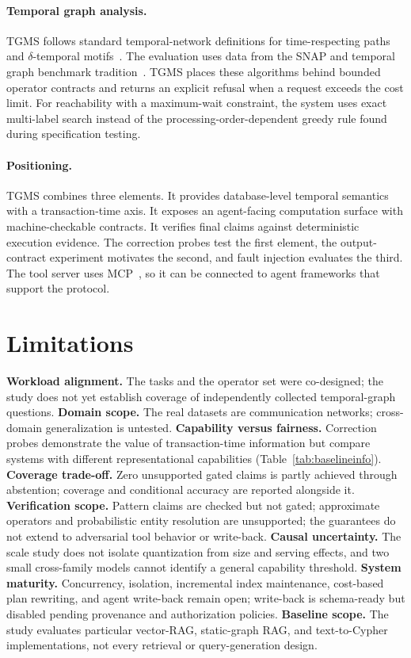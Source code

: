 \documentclass[11pt]{article}
\begin{document}
\paragraph{Temporal graph analysis.}
TGMS follows standard temporal-network definitions for time-respecting
paths~\cite{wu2014path,holme2012temporal} and $\delta$-temporal
motifs~\cite{paranjape2017motifs}. The evaluation uses data from the
SNAP and temporal graph benchmark tradition~\cite{panzarasa2009,huang2023tgb}.
TGMS places these algorithms behind bounded operator contracts and
returns an explicit refusal when a request exceeds the cost limit. For
reachability with a maximum-wait constraint, the system uses exact
multi-label search instead of the processing-order-dependent greedy rule
found during specification testing.

\paragraph{Positioning.}
TGMS combines three elements. It provides database-level temporal
semantics with a transaction-time axis. It exposes an agent-facing
computation surface with machine-checkable contracts. It verifies final
claims against deterministic execution evidence. The correction probes
test the first element, the output-contract experiment motivates the
second, and fault injection evaluates the third. The tool server uses
MCP~\cite{mcp2024}, so it can be connected to agent frameworks that
support the protocol.

\section{Limitations}
\label{sec:limits}
\textbf{Workload alignment.} The tasks and the operator set were
co-designed; the study does not yet establish coverage of independently
collected temporal-graph questions.
\textbf{Domain scope.} The real datasets are communication networks;
cross-domain generalization is untested.
\textbf{Capability versus fairness.} Correction probes demonstrate the
value of transaction-time information but compare systems with
different representational capabilities
(Table~\ref{tab:baselineinfo}).
\textbf{Coverage trade-off.} Zero unsupported gated claims is partly
achieved through abstention; coverage and conditional accuracy are
reported alongside it.
\textbf{Verification scope.} Pattern claims are checked but not gated;
approximate operators and probabilistic entity resolution are
unsupported; the guarantees do not extend to adversarial tool behavior
or write-back.
\textbf{Causal uncertainty.} The scale study does not isolate
quantization from size and serving effects, and two small cross-family
models cannot identify a general capability threshold.
\textbf{System maturity.} Concurrency, isolation, incremental index
maintenance, cost-based plan rewriting, and agent write-back remain
open; write-back is schema-ready but disabled pending provenance and
authorization policies.
\textbf{Baseline scope.} The study evaluates particular vector-RAG,
static-graph RAG, and text-to-Cypher implementations, not every
retrieval or query-generation design.
\end{document}
